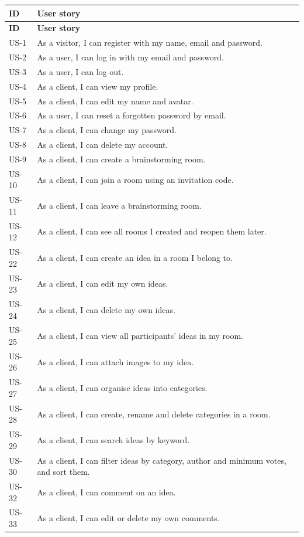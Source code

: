 \documentclass[12pt,a4paper]{report}
\begin{document}
\begin{longtable}{@{}p{}p{}@{}}
\toprule
\textbf{ID} & \textbf{User story} \\
\midrule
\endfirsthead
\toprule
\textbf{ID} & \textbf{User story} \\
\midrule
\endhead
\bottomrule
\endfoot
US-1 & As a visitor, I can register with my name, email and password. \\
US-2 & As a user, I can log in with my email and password. \\
US-3 & As a user, I can log out. \\
US-4 & As a client, I can view my profile. \\
US-5 & As a client, I can edit my name and avatar. \\
US-6 & As a user, I can reset a forgotten password by email. \\
US-7 & As a client, I can change my password. \\
US-8 & As a client, I can delete my account. \\
US-9 & As a client, I can create a brainstorming room. \\
US-10 & As a client, I can join a room using an invitation code. \\
US-11 & As a client, I can leave a brainstorming room. \\
US-12 & As a client, I can see all rooms I created and reopen them later. \\
US-22 & As a client, I can create an idea in a room I belong to. \\
US-23 & As a client, I can edit my own ideas. \\
US-24 & As a client, I can delete my own ideas. \\
US-25 & As a client, I can view all participants' ideas in my room. \\
US-26 & As a client, I can attach images to my idea. \\
US-27 & As a client, I can organise ideas into categories. \\
US-28 & As a client, I can create, rename and delete categories in a room. \\
US-29 & As a client, I can search ideas by keyword. \\
US-30 & As a client, I can filter ideas by category, author and minimum votes, and sort them. \\
US-32 & As a client, I can comment on an idea. \\
US-33 & As a client, I can edit or delete my own comments. \\

\end{longtable}
\end{document}
